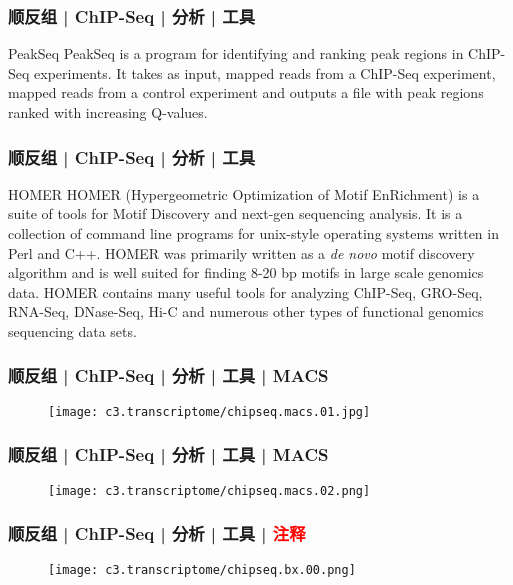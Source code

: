 \begin{frame}
  \frametitle{顺反组 | ChIP-Seq | 分析 | 工具}
  \begin{block}{PeakSeq}
    PeakSeq is a program for identifying and ranking peak regions in ChIP-Seq experiments. It takes as input, mapped reads from a ChIP-Seq experiment, mapped reads from a control experiment and outputs a file with peak regions ranked with increasing Q-values. 
  \end{block}
\end{frame}

\begin{frame}
  \frametitle{顺反组 | ChIP-Seq | 分析 | 工具}
  \begin{block}{HOMER}
    HOMER (Hypergeometric Optimization of Motif EnRichment) is a suite of tools for Motif Discovery and next-gen sequencing analysis.  It is a collection of command line programs for unix-style operating systems written in Perl and C++. HOMER was primarily written as a \textit{de novo} motif discovery algorithm and is well suited for finding 8-20 bp motifs in large scale genomics data.  HOMER contains many useful tools for analyzing ChIP-Seq, GRO-Seq, RNA-Seq, DNase-Seq, Hi-C and numerous other types of functional genomics sequencing data sets.
  \end{block}
\end{frame}

\begin{frame}
  \frametitle{顺反组 | ChIP-Seq | 分析 | 工具 | MACS}
  \begin{figure}
    \centering
    \texttt{[image: c3.transcriptome/chipseq.macs.01.jpg]}
  \end{figure}
\end{frame}

\begin{frame}
  \frametitle{顺反组 | ChIP-Seq | 分析 | 工具 | MACS}
  \begin{figure}
    \centering
    \texttt{[image: c3.transcriptome/chipseq.macs.02.png]}
  \end{figure}
\end{frame}

\begin{frame}
  \frametitle{顺反组 | ChIP-Seq | 分析 | 工具 | \textcolor{red}{注释}}
  \begin{figure}
    \centering
    \texttt{[image: c3.transcriptome/chipseq.bx.00.png]}
  \end{figure}
\end{frame}

